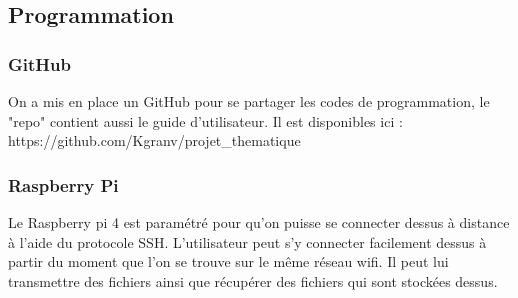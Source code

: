 \documentclass[a4paper, 11pt]{article}
\begin{document}
\subsection{Programmation}
\subsubsection{GitHub}
On a mis en place un GitHub pour se partager les codes de programmation, le "repo" contient aussi le guide d'utilisateur.
Il est disponibles ici : https://github.com/Kgranv/projet\_thematique
\subsubsection{Raspberry Pi}
Le Raspberry pi 4 est paramétré pour qu'on puisse se connecter dessus à distance à l'aide du protocole SSH.
L'utilisateur peut s'y connecter facilement dessus à partir du moment que l'on se trouve sur le même réseau wifi.
Il peut lui transmettre des fichiers ainsi que récupérer des fichiers qui sont stockées dessus.
\end{document}
